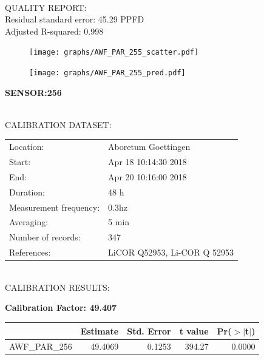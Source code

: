 \documentclass[oneside]{report}
\begin{document}
\hrulefill\\
QUALITY REPORT:\\
Residual standard error: 45.29 PPFD\\
Adjusted R-squared: 0.998



\begin{figure}[H]
  \centering
  \texttt{[image: graphs/AWF\_PAR\_255\_scatter.pdf]}
\end{figure}




\begin{figure}[H]
  \centering
  \texttt{[image: graphs/AWF\_PAR\_255\_pred.pdf]}
\end{figure}

\pagebreak


\begin{center}
\large{\textbf{SENSOR:256}}\\
\end{center}

\hrulefill\\
CALIBRATION DATASET:\\
\begin{table}[h!]
  \centering
  \label{tab:table1}
  \begin{tabular}{ll}
    Location: & Aboretum Goettingen\\ 
    
    
    Start:  & Apr 18 10:14:30 2018 \\
    End:   & Apr 20 10:16:00 2018\\ 
    Duration: & 48 h\\
    Measurement frequency: & 0.3hz\\
    Averaging:  &5 min\\
    Number of records: & 347 \\
    References: & LiCOR Q52953, Li-COR Q 52953 \\
  \end{tabular}
\end{table}

\hrulefill\\
CALIBRATION RESULTS:\\


\begin{center}
\textbf{\large{Calibration Factor: 49.407}}\\
\end{center}
\begin{table}[ht]
\centering
\begin{tabular}{rrrrr}
  \hline
 & Estimate & Std. Error & t value & Pr($>$$|$t$|$) \\ 
  \hline
AWF\_PAR\_256 & 49.4069 & 0.1253 & 394.27 & 0.0000 \\ 
   \hline
\end{tabular}
\end{table}
\end{document}
